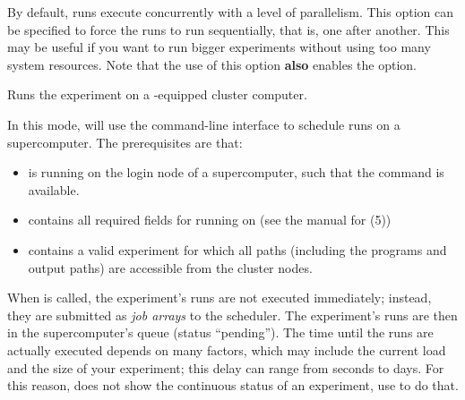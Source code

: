 \documentclass[a4paper,english]{article}
\begin{document}
\begin{adjustwidth}{18pt}{0pt}
\begin{Description}[Subcommands]
\begin{Description}[Options]
                                \item[\Opt{\ddash sequential}]
                                  By default, runs execute concurrently with a level of parallelism.
                                  This option can be specified to force the runs to run sequentially, that is, one after another.
                                  This may be useful if you want to run bigger experiments without using too many system resources.
                                  Note that the use of this option \textbf{also} enables the  option.
                            \end{Description}

                    \item[\Arg{slurm}]
                        Runs the experiment on a -equipped cluster computer.

                        In this mode,  will use the  command-line
                        interface to schedule runs on a supercomputer.
                        The prerequisites are that:
                        \begin{itemize}
                            \item {} is running on the login node of a supercomputer, such
                                  that the  command is available.
                            \item {} contains all required fields for running on
                                   (see the manual for (5))
                            \item {} contains a valid experiment for which all
                                  paths (including the programs and output paths) are accessible
                                  from the cluster nodes.
                        \end{itemize}

                        When    is called, the experiment's runs
                        are not executed immediately; instead, they are submitted as \emph{job arrays}
                        to the  scheduler.
                        The experiment's runs are then in the supercomputer's queue (status ``pending'').
                        The time until the runs are actually executed depends on many factors, which
                        may include the current load and the size of your experiment; this
                        delay can range from seconds to days.
                        For this reason,    does not show the
                        continuous status of an experiment, use   to do that.


\end{Description}
\end{adjustwidth}
\end{document}
